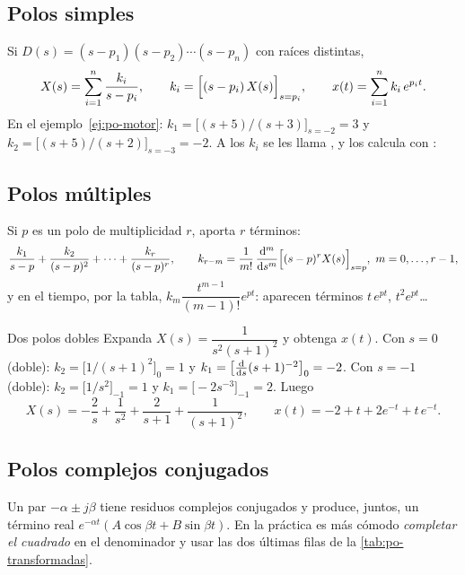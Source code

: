\subsection{Polos simples}
Si $D(s)=(s-p_1)(s-p_2)\cdots(s-p_n)$ con raíces distintas,
\begin{equation}
  X(s)=\sum_{i=1}^n\frac{k_i}{s-p_i},\qquad
  k_i=\Bigl[(s-p_i)\,X(s)\Bigr]_{s=p_i},\qquad
  x(t)=\sum_{i=1}^n k_i\,e^{p_it}.
  \label{eq:po-residuos}
\end{equation}
En el ejemplo~\ref{ej:po-motor}: $k_1=\bigl[(s+5)/(s+3)\bigr]_{s=-2}=3$ y $k_2=\bigl[(s+5)/(s+2)\bigr]_{s=-3}=-2$. A los $k_i$ se les llama , y \matlab los calcula con :

\subsection{Polos múltiples}
Si $p$ es un polo de multiplicidad $r$, aporta $r$ términos:
\[
  \frac{k_{1}}{s-p}+\frac{k_{2}}{(s-p)^2}+\cdots+\frac{k_{r}}{(s-p)^r},\qquad
  k_{r-m}=\frac{1}{m!}\,\frac{\mathrm{d}^m}{\mathrm{d} s^m}\Bigl[(s-p)^rX(s)\Bigr]_{s=p},\ m=0,\dots,r-1,
\]
y en el tiempo, por la tabla, $k_m\dfrac{t^{m-1}}{(m-1)!}e^{pt}$: aparecen términos $t\,e^{pt}$, $t^2e^{pt}$\ldots

\begin{ejemplo}[label=ej:po-multiples]{Dos polos dobles}
Expanda $X(s)=\dfrac{1}{s^2(s+1)^2}$ y obtenga $x(t)$.
\solucion Con $s=0$ (doble): $k_2=\bigl[1/(s+1)^2\bigr]_0=1$ y $k_1=\bigl[\tfrac{\mathrm{d}}{\mathrm{d} s}(s+1)^{-2}\bigr]_0=-2$. Con $s=-1$ (doble): $k_2=\bigl[1/s^2\bigr]_{-1}=1$ y $k_1=\bigl[-2s^{-3}\bigr]_{-1}=2$. Luego
\[
  X(s)=-\frac2s+\frac1{s^2}+\frac2{s+1}+\frac1{(s+1)^2},\qquad
  x(t)=-2+t+2e^{-t}+t\,e^{-t}.
\]
\end{ejemplo}

\subsection{Polos complejos conjugados}
Un par $-\alpha\pm j\beta$ tiene residuos complejos conjugados y produce, juntos, un término real $e^{-\alpha t}(A\cos\beta t+B\sin\beta t)$. En la práctica es más cómodo \emph{completar el cuadrado} en el denominador y usar las dos últimas filas de la \cref{tab:po-transformadas}.

